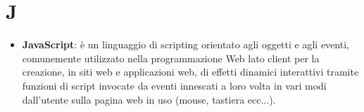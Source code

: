 \section{J}
\begin{itemize} 
	\item
	\textbf{JavaScript}:  è un linguaggio di scripting orientato agli oggetti e agli eventi, comunemente utilizzato nella programmazione Web lato client per la creazione, in siti web e applicazioni web, di effetti dinamici interattivi tramite funzioni di script invocate da eventi innescati a loro volta in vari modi dall'utente sulla pagina web in uso (mouse, tastiera ecc...).
\end{itemize}